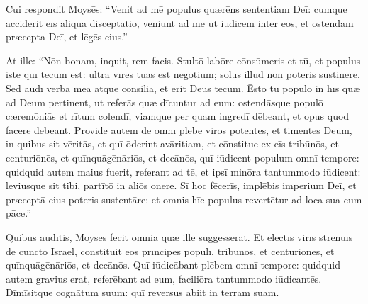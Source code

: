 Cui respondit
Moysēs: ``Venit ad mē populus quærēns sententiam Deī: 
cumque acciderit
eīs aliqua disceptātiō, veniunt ad mē ut
iūdicem inter eōs, et ostendam
præcepta Deī, et lēgēs eius.''

At ille: ``Nōn bonam, inquit, rem facis. 
Stultō labōre cōnsūmeris et tū, et
populus iste quī tēcum est: ultrā vīrēs tuās est negōtium; sōlus illud
nōn poteris sustinēre. 
Sed audī verba mea atque cōnsilia, et erit Deus
tēcum. Ēsto tū populō in hīs quæ ad Deum pertinent, ut referās quæ
dīcuntur ad eum: 
ostendāsque populō cæremōniās et
rītum colendī,
viamque per quam ingredī dēbeant, et opus quod
facere dēbeant. 
Prōvidē autem dē omnī plēbe virōs
potentēs, et timentēs Deum, in quibus sit vēritās, et quī
ōderint avāritiam, et cōnstitue ex eīs
tribūnōs, et centuriōnēs, et
quīnquāgēnāriōs, et decānōs, 
quī
iūdicent populum omnī tempore: quidquid autem maius fuerit, referant ad
tē, et ipsī minōra tantummodo iūdicent: leviusque sit
tibi, partītō in aliōs onere.
Sī hoc fēcerīs, implēbis imperium Deī, et præceptā eius poteris
sustentāre: et omnis hīc populus revertētur ad
loca sua cum pāce.'' 

Quibus audītis, Moysēs fēcit omnia quæ ille
suggesserat. 
Et ēlēctīs virīs strēnuīs
dē cūnctō Isrāēl, cōnstituit eōs prīncipēs populī, tribūnōs, et
centuriōnēs, et quīnquāgēnāriōs, et decānōs. 
Quī iūdicābant
plēbem omnī tempore: quidquid autem gravius erat,
referēbant ad eum, faciliōra tantummodo iūdicantēs. 
Dīmīsitque
cognātum suum: quī reversus abiit in terram suam. 
